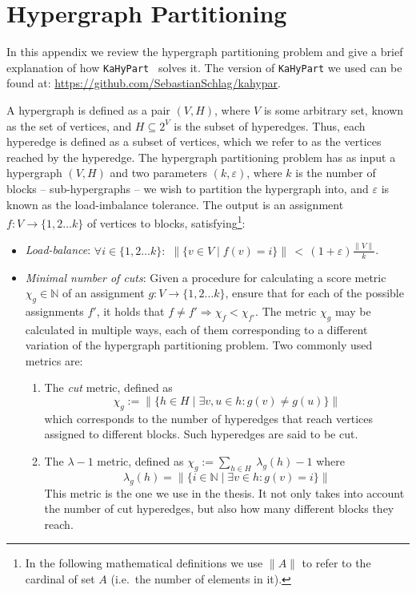 \chapter{Hypergraph Partitioning}
\label{chap:HypPart}

In this appendix we review the hypergraph partitioning problem and give a brief explanation of how \texttt{KaHyPart}~\citep{KaHyPart} solves it. The version of \texttt{KaHyPart} we used can be found at: \url{https://github.com/SebastianSchlag/kahypar}.

A hypergraph is defined as a pair \((V,H)\), where \(V\) is some arbitrary set, known as the set of vertices, and \(H \subseteq 2^V\) is the subset of hyperedges. Thus, each hyperedge is defined as a subset of vertices, which we refer to as the vertices reached by the hyperedge. The hypergraph partitioning problem has as input a hypergraph \((V,H)\) and two parameters \((k,\varepsilon)\), where \(k\) is the number of blocks -- sub-hypergraphs -- we wish to partition the hypergraph into, and \(\varepsilon\) is known as the load-imbalance tolerance. The output is an assignment \(f\colon V \to \{1,2 \dots k\}\) of vertices to blocks, satisfying\footnote{In the following mathematical definitions we use \(\lVert A \rVert\) to refer to the cardinal of set \(A\) (i.e.\ the number of elements in it).}:

\begin{itemize}
  \item \textit{Load-balance}: \(\forall i \in \{1,2 \dots k\}\colon \,\, \lVert \{v \in V \mid f(v) = i\} \rVert \, < \, (1+\varepsilon)\frac{\lVert V \rVert}{k} \).
  \item \textit{Minimal number of cuts}: Given a procedure for calculating a score metric \(\chi_g \in \mathbb{N}\) of an assignment \(g\colon V \to \{1,2 \dots k\}\), ensure that for each of the possible assignments \(f'\), it holds that \(f \not = f' \Rightarrow  \chi_f < \chi_{f'}\). The metric \(\chi_g\) may be calculated in multiple ways, each of them corresponding to a different variation of the hypergraph partitioning problem. Two commonly used metrics are:
    \begin{enumerate} 
      \renewcommand{\theenumi}{\alph{enumi})}
      \item The \textit{cut} metric, defined as \[\chi_g := \lVert \{h \in H \mid \exists v,u \in h\colon g(v) \not = g(u) \} \rVert\] which corresponds to the number of hyperedges that reach vertices assigned to different blocks. Such hyperedges are said to be cut. 
      \item The \(\lambda\!-\!1\) metric, defined as \(\chi_g := \sum_{h \in H} \ \lambda_g(h)\!-\! 1\) where \[\lambda_g(h) = \lVert \{i \in \mathbb{N} \mid \exists v \in h\colon g(v)=i \} \rVert\] This metric is the one we use in the thesis. It not only takes into account the number of cut hyperedges, but also how many different blocks they reach.
    \end{enumerate}
\end{itemize}

